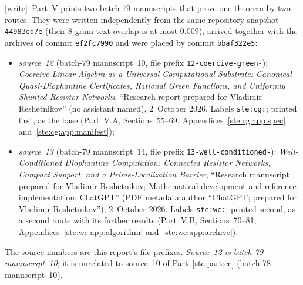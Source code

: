 \documentclass[11pt,letterpaper]{article}
\theoremstyle{definition}
\theoremstyle{remark}
\newcommand{\wtag}{\textup{[write]}}
\begin{document}
\noindent\wtag\ Part~V prints two batch-79 manuscripts that prove one theorem by two routes. They were written independently from the same repository snapshot \texttt{44983ed7e} (their 8-gram text overlap is at most 0.009), arrived together with the archives of commit \texttt{ef2fc7990} and were placed by commit \texttt{bbaf322e5}:
\begin{itemize}
\item \emph{source~12} (batch-79 manuscript~10, file prefix \texttt{12-coercive-green-}): \emph{Coercive Linear Algebra as a Universal Computational Substrate: Canonical Quasi-Diophantine Certificates, Rational Green Functions, and Uniformly Shunted Resistor Networks}, ``Research report prepared for Vladimir Reshetnikov'' (no assistant named), 2~October 2026. Labels \texttt{ste:cg:}; printed first, as the base (Part~V.A, Sections~55--69, Appendices~\ref{ste:cg:app:spec} and~\ref{ste:cg:app:manifest});
\item \emph{source~13} (batch-79 manuscript~14, file prefix \texttt{13-well-conditioned-}): \emph{Well-Conditioned Diophantine Computation: Connected Resistor Networks, Compact Support, and a Prime-Localization Barrier}, ``Research manuscript prepared for Vladimir Reshetnikov; Mathematical development and reference implementation: ChatGPT'' (PDF metadata author ``ChatGPT; prepared for Vladimir Reshetnikov''), 2~October 2026. Labels \texttt{ste:wc:}; printed second, as a second route with its further results (Part~V.B, Sections~70--81, Appendices~\ref{ste:wc:app:algorithm} and~\ref{ste:wc:app:archive}).
\end{itemize}
The source numbers are this report's file prefixes. \emph{Source~12 is batch-79 manuscript~10}; it is unrelated to source~10 of Part~\ref{ste:part:ec} (batch-78 manuscript~10).
\end{document}
